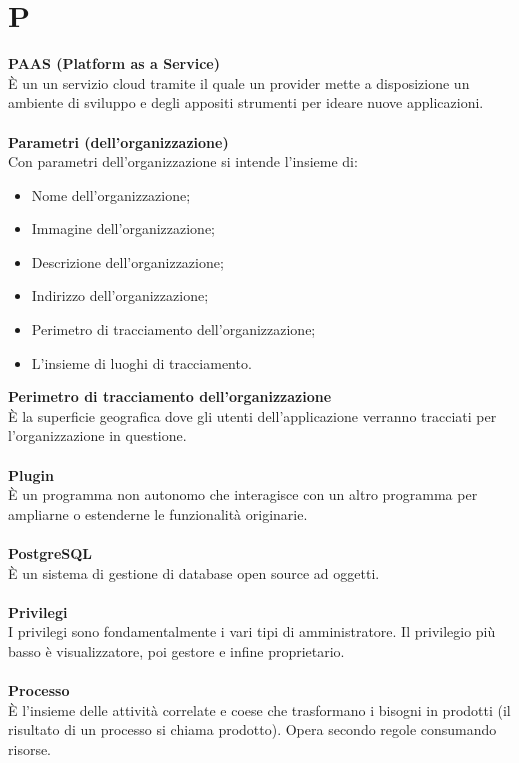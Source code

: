 \section{P}
\textbf{PAAS (Platform as a Service)}\\
È un un servizio cloud tramite il quale un provider mette a disposizione un ambiente di sviluppo e degli appositi strumenti per ideare nuove applicazioni. \\ \\
\textbf{Parametri (dell'organizzazione)}\\
Con parametri dell'organizzazione si intende l'insieme di:
\begin{itemize}
    \item Nome dell'organizzazione;
    \item Immagine dell'organizzazione;
    \item Descrizione dell'organizzazione;
    \item Indirizzo dell'organizzazione;
    \item Perimetro di tracciamento dell'organizzazione;
    \item L'insieme di luoghi di tracciamento.
\end{itemize}
\textbf{Perimetro di tracciamento dell'organizzazione}\\
È la superficie geografica dove gli utenti dell'applicazione verranno tracciati per l'organizzazione in questione.\\ \\
\textbf{Plugin}\\
È un programma non autonomo che interagisce con un altro programma per ampliarne o estenderne le funzionalità originarie. \\ \\
\textbf{PostgreSQL}\\
È un sistema di gestione di database open source ad oggetti. \\ \\
\textbf{Privilegi}\\
I privilegi sono fondamentalmente i vari tipi di amministratore. Il privilegio più basso è visualizzatore, poi gestore e infine proprietario. \\ \\
\textbf{Processo}\\ 
È l'insieme delle attività correlate e coese che trasformano i bisogni in prodotti (il risultato di un processo si chiama prodotto). Opera secondo regole consumando risorse. \\ \\

